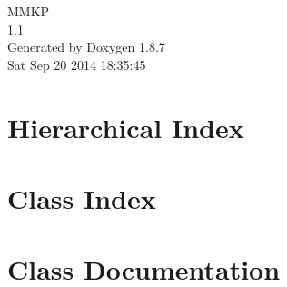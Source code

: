 \documentclass[twoside]{book}
\newcommand{\+}{\discretionary{\mbox{\scriptsize$\hookleftarrow$}}{}{}}
\newcommand{\clearemptydoublepage}{%
  \newpage{\pagestyle{empty}\cleardoublepage}%
}
\begin{document}
\hypersetup{pageanchor=false,
             bookmarks=true,
             bookmarksnumbered=true,
             pdfencoding=unicode
            }
\begin{titlepage}
\vspace*{7cm}
\begin{center}%
{\Large M\+M\+K\+P \\[1ex]\large 1.\+1 }\\
\vspace*{1cm}
{\large Generated by Doxygen 1.8.7}\\
\vspace*{0.5cm}
{\small Sat Sep 20 2014 18:35:45}\\
\end{center}
\end{titlepage}
\clearemptydoublepage
\tableofcontents
\clearemptydoublepage
{}
\hypersetup{pageanchor=true}

\chapter{Hierarchical Index}

\chapter{Class Index}

\chapter{Class Documentation}






























\newpage
{}
{}
\printindex
\end{document}
